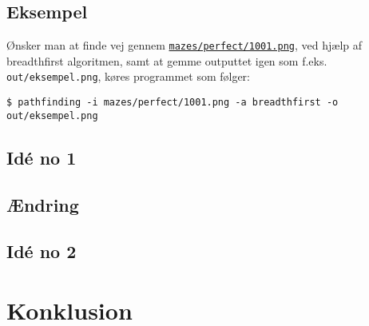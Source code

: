 \documentclass[a4paper, 12pt]{article}
\begin{document}
\subsection{Eksempel}
Ønsker man at finde vej gennem \texttt{\href{https://github.com/Tinggaard/pathfinding/blob/master/mazes/perfect/1001.png}{mazes/perfect/1001.png}}, ved hjælp af breadthfirst algoritmen, samt at gemme outputtet igen som f.eks. \texttt{out/eksempel.png}, køres programmet som følger:
\begin{verbatim}
$ pathfinding -i mazes/perfect/1001.png -a breadthfirst -o out/eksempel.png
\end{verbatim}


\subsection{Idé no 1}
\subsection{Ændring}
\subsection{Idé no 2}


\newpage
\section{Konklusion}




\newpage
\begin{appendices}
\end{appendices}
\end{document}
